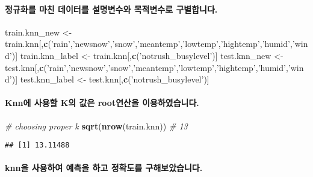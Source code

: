 \documentclass[]{article}
\newenvironment{Shaded}{\begin{snugshade}}{\end{snugshade}}
\newcommand{\KeywordTok}[1]{\textcolor[rgb]{0.13,0.29,0.53}{\textbf{#1}}}
\newcommand{\StringTok}[1]{\textcolor[rgb]{0.31,0.60,0.02}{#1}}
\newcommand{\CommentTok}[1]{\textcolor[rgb]{0.56,0.35,0.01}{\textit{#1}}}
\newcommand{\NormalTok}[1]{#1}
\let\oldparagraph\paragraph
\renewcommand{\paragraph}[1]{\oldparagraph{#1}\mbox{}}
\begin{document}
\paragraph{정규화를 마친 데이터를 설명변수와 목적변수로
구별합니다.}\label{-----.}

\begin{Shaded}
\begin{Highlighting}[]
\NormalTok{train.knn_new  <-}\StringTok{  }\NormalTok{train.knn[,}\KeywordTok{c}\NormalTok{(}\StringTok{'rain'}\NormalTok{,}\StringTok{'newsnow'}\NormalTok{,}\StringTok{'snow'}\NormalTok{,}\StringTok{'meantemp'}\NormalTok{,}\StringTok{'lowtemp'}\NormalTok{,}\StringTok{'hightemp'}\NormalTok{,}\StringTok{'humid'}\NormalTok{,}\StringTok{'wind'}\NormalTok{)]}
\NormalTok{train.knn_label <-}\StringTok{ }\NormalTok{train.knn[,}\KeywordTok{c}\NormalTok{(}\StringTok{'notrush_busylevel'}\NormalTok{)]}
\NormalTok{test.knn_new <-}\StringTok{  }\NormalTok{test.knn[,}\KeywordTok{c}\NormalTok{(}\StringTok{'rain'}\NormalTok{,}\StringTok{'newsnow'}\NormalTok{,}\StringTok{'snow'}\NormalTok{,}\StringTok{'meantemp'}\NormalTok{,}\StringTok{'lowtemp'}\NormalTok{,}\StringTok{'hightemp'}\NormalTok{,}\StringTok{'humid'}\NormalTok{,}\StringTok{'wind'}\NormalTok{)]}
\NormalTok{test.knn_label <-}\StringTok{ }\NormalTok{test.knn[,}\KeywordTok{c}\NormalTok{(}\StringTok{'notrush_busylevel'}\NormalTok{)]}
\end{Highlighting}
\end{Shaded}

\paragraph{Knn에 사용할 K의 값은 root연산을
이용하였습니다.}\label{knn--k--root-.}

\begin{Shaded}
\begin{Highlighting}[]
\CommentTok{# choosing proper k }
\KeywordTok{sqrt}\NormalTok{(}\KeywordTok{nrow}\NormalTok{(train.knn)) }\CommentTok{# 13}
\end{Highlighting}
\end{Shaded}

\begin{verbatim}
## [1] 13.11488
\end{verbatim}

\paragraph{knn을 사용하여 예측을 하고 정확도를
구해보았습니다.}\label{knn-----.}
\end{document}
